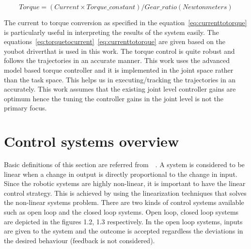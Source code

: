 \begin{equation}
Torque= (Current \times Torque\_constant) / Gear\_ratio (Newton meters)
\label{eq:currenttotorque}
\end{equation}

The current to torque conversion as specified in the equation~\eqref{eq:currenttotorque} is particularly useful in interpreting the results of the system easily. The equations~\eqref{eq:torquetocurrent}~\eqref{eq:currenttotorque} are given based on the youbot driver\protect\footnotemark that is used in this work.  The torque control is quite robust and follows the trajectories in an accurate manner. This work uses the advanced model based torque controller and it is implemented in the joint space rather than the task space. This helps us in executing/tracking the trajectories in an accurately. This work assumes that the existing joint level controller gains are optimum hence the tuning the controller gains in the joint level is not the primary focus.

\section*{Control systems overview}
Basic definitions of this section are referred from~\cite{sellers2001overview}~\cite{astrom1995pid}. A system is considered to be linear when a change in output is directly proportional to the change in input. Since the robotic systems are highly non-linear, it is important to have the linear control strategy. This is achieved by using the linearization techniques that solves the non-linear systems problem. There are two kinds of control systems available such as open loop and the closed loop systems. Open loop, closed loop systems are depicted in the figures 1.2, 1.3 respectively. In the open loop systems, inputs are given to the system and the outcome is accepted regardless the deviations in the desired behaviour (feedback is not considered).

